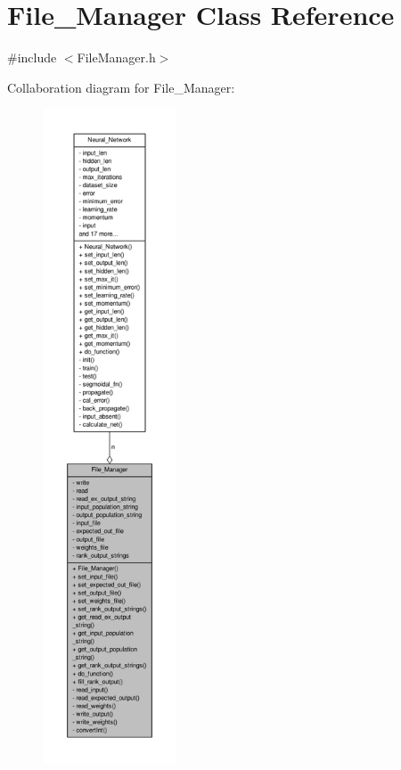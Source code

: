 \hypertarget{a00001}{\section{File\-\_\-\-Manager Class Reference}
\label{d8/d84/a00001}
}


{\ttfamily \#include $<$File\-Manager.\-h$>$}



Collaboration diagram for File\-\_\-\-Manager\-:
\nopagebreak
\begin{figure}[H]
\begin{center}
\leavevmode
\includegraphics[height=550pt]{d5/db6/a00042}
\end{center}
\end{figure}
